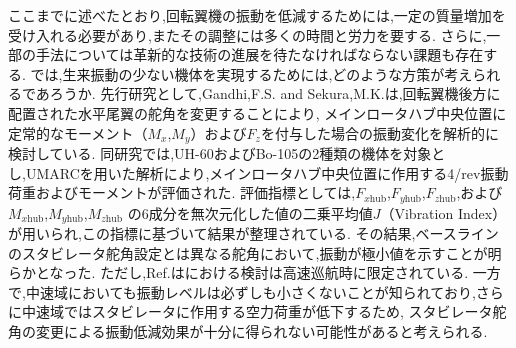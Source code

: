     \par    
    ここまでに述べたとおり,回転翼機の振動を低減するためには,一定の質量増加を受け入れる必要があり,またその調整には多くの時間と労力を要する.
    さらに,一部の手法については革新的な技術の進展を待たなければならない課題も存在する.
    では,生来振動の少ない機体を実現するためには,どのような方策が考えられるであろうか.
    先行研究として,Gandhi,F.S. and Sekura,M.K.は,回転翼機後方に配置された水平尾翼の舵角を変更することにより,
    メインロータハブ中央位置に定常的なモーメント（$M_x$,$M_y$）および$F_z$を付与した場合の振動変化を解析的に検討している.
    同研究では,UH-60およびBo-105の2種類の機体を対象とし,UMARCを用いた解析により,メインロータハブ中央位置に作用する4/rev振動荷重およびモーメントが評価された.
    評価指標としては,$F_{x\mathrm{hub}}$,$F_{y\mathrm{hub}}$,$F_{z\mathrm{hub}}$,および$M_{x\mathrm{hub}}$,$M_{y\mathrm{hub}}$,$M_{z\mathrm{hub}}$
    の6成分を無次元化した値の二乗平均値$J$（Vibration Index）が用いられ,この指標に基づいて結果が整理されている.
    その結果,ベースラインのスタビレータ舵角設定とは異なる舵角において,振動が極小値を示すことが明らかとなった.
    ただし,Ref.\cite{gandhi_sekura_2004}はにおける検討は高速巡航時に限定されている.
    一方で,中速域においても振動レベルは必ずしも小さくないことが知られており,さらに中速域ではスタビレータに作用する空力荷重が低下するため,
    スタビレータ舵角の変更による振動低減効果が十分に得られない可能性があると考えられる.


    \clearpage    
